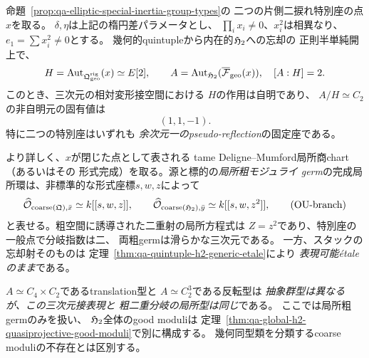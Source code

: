 \begin{theorem}[特殊ruling慣性の法表現と局所粗二重分岐]
\label{thm:qa-ou-special-reflection-coarse-branch}
命題~\ref{prop:qa-elliptic-special-inertia-group-types}の
二つの片側二捩れ特別座の点$x$を取る。
$\delta,\eta$は上記の楕円差パラメータとし、
$\prod_i x_i\ne0$、$x_i^2$は相異なり、
$e_1=\sum x_i^2\ne0$とする。
幾何的quintupleから内在的$\mathfrak H_2$への忘却の
正則半単純開上で、
\[
 H=\operatorname{Aut}_{\mathfrak Q_{\mathrm{geo}}^{\mathrm{rig}}}(x)
   \simeq E[2],\qquad
 A=\operatorname{Aut}_{\mathfrak H_2}(\overline{\mathcal F}_{\mathrm{geo}}(x)),
 \quad [A:H]=2 .
\]
このとき、三次元の相対変形接空間における
$H$の作用は自明であり、
$A/H\simeq C_2$の非自明元の固有値は
\[
 \left(1,1,-1\right).
 \tag{OU-reflection}\label{eq:qa-ou-special-normal-representation}
\]
特に二つの特別座はいずれも
\emph{余次元一のpseudo-reflection}の固定座である。

より詳しく、$x$が閉じた点として表される
tame Deligne--Mumford局所商chart（あるいはその
形式完成）を取る。源と標的の\emph{局所粗モジュライ
germ}の完成局所環は、非標準的な形式座標$s,w,z$によって
\[
 \widehat{\mathcal O}_{\mathrm{coarse}(\mathfrak Q),\bar x}
  \simeq k[[s,w,z]],\qquad
 \widehat{\mathcal O}_{\mathrm{coarse}(\mathfrak H_2),\bar y}
  \simeq k[[s,w,z^2]],
 \tag{OU-branch}\label{eq:qa-ou-special-coarse-branch}
\]
と表せる。粗空間に誘導された二重射の局所方程式は
$Z=z^2$であり、特別座の一般点で分岐指数は二、
両粗germは滑らかな三次元である。
一方、スタックの忘却射そのものは
定理~\ref{thm:qa-quintuple-h2-generic-etale}により
\emph{表現可能étaleのまま}である。

$A\simeq C_4\times C_2$であるtranslation型と
$A\simeq C_2^3$である反転型は
\emph{抽象群型は異なるが、この三次元接表現と
粗二重分岐の局所型は同じ}である。
ここでは局所粗germのみを扱い、
$\mathfrak H_2$全体のgood moduliは
定理~\ref{thm:qa-global-h2-quasiprojective-good-moduli}で別に構成する。
幾何同型類を分類するcoarse moduliの不存在とは区別する。
\end{theorem}
